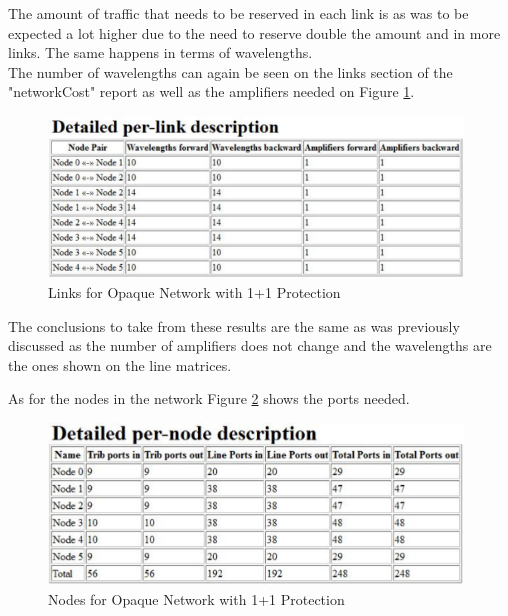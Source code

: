 	The amount of traffic that needs to be reserved in each link is as was to be expected a lot higher due to the need to reserve double the amount and in more links. The same happens in terms of wavelengths. \\
	
%	
%	
	
	The number of wavelengths can again be seen on the links section of the "networkCost" report as well as the amplifiers needed on Figure \ref{networkCost_Report_Links_Opaque11}.
	
	\begin{figure}[h!]
		\centering
		\includegraphics[width=11cm]{networkCost_Report_Links_Opaque11.pdf}	
		\caption{Links for Opaque Network with 1+1 Protection}
		\label{networkCost_Report_Links_Opaque11}								
	\end{figure}	
	
	The conclusions to take from these results are the same as was previously discussed as the number of amplifiers does not change and the wavelengths are the ones shown on the line matrices.
	
	As for the nodes in the network Figure \ref{networkCost_Report_Nodes_Opaque11} shows the ports needed.
	
	\begin{figure}[h!]
		\centering
		\includegraphics[width=11cm]{networkCost_Report_Nodes_Opaque11.pdf}	
		\caption{Nodes for Opaque Network with 1+1 Protection}
		\label{networkCost_Report_Nodes_Opaque11}								
	\end{figure}		
	

